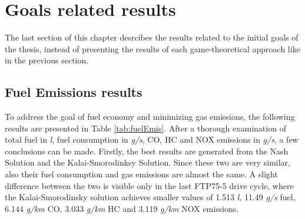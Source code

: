 \section{Goals related results}
The last section of this chapter desrcibes the results related to the initial goals of the thesis, instead of presenting the results of each game-theoretical approach like in the previous section.

\subsection{Fuel Emissions results}
To address the goal of fuel economy and minimizing gas emissions, the following results are presented in Table \ref{tab:fuelEmis}. After a thorough examination of total fuel in \textit{l}, fuel consumption in \textit{g/s}, CO, HC and NOX emissions in \textit{g/s}, a few conclusions can be made. Firstly, the best results are generated from the Nash Solution and the Kalai-Smorodinksy Solution. Since these two are very similar, also their fuel consumption and gas emissions are almost the same. A slight difference between the two is visible only in the last FTP75-5 drive cycle, where the Kalai-Smorodinsky solution achieves smaller values of 1.513 \textit{l}, 11.49 \textit{g/s} fuel, 6.144 \textit{g/km} CO, 3.033 \textit{g/km} HC and 3.119 \textit{g/km} NOX emissions.

